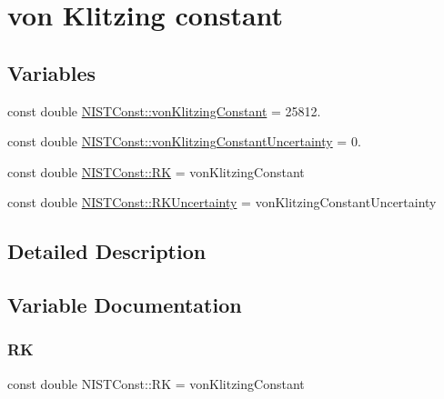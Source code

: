 \hypertarget{group___n_i_s_t_const-von_klitzing_constant}{}\section{von Klitzing constant}
\label{group___n_i_s_t_const-von_klitzing_constant}
\subsection*{Variables}
\begin{DoxyCompactItemize}
\item 
const double \hyperlink{group___n_i_s_t_const-von_klitzing_constant_ga664441cab64a6a8feda702f6354c1e7f}{N\+I\+S\+T\+Const\+::von\+Klitzing\+Constant} = 25812.
\item 
const double \hyperlink{group___n_i_s_t_const-von_klitzing_constant_ga8fa7b05f4ab4958f9bed81f592304e49}{N\+I\+S\+T\+Const\+::von\+Klitzing\+Constant\+Uncertainty} = 0.
\item 
const double \hyperlink{group___n_i_s_t_const-von_klitzing_constant_ga49d5fad3e8e7b5800765ce47a748ebae}{N\+I\+S\+T\+Const\+::\+RK} = von\+Klitzing\+Constant
\item 
const double \hyperlink{group___n_i_s_t_const-von_klitzing_constant_ga2be2be38b579e6afb6f1b0d177d7786b}{N\+I\+S\+T\+Const\+::\+R\+K\+Uncertainty} = von\+Klitzing\+Constant\+Uncertainty
\end{DoxyCompactItemize}


\subsection{Detailed Description}


\subsection{Variable Documentation}
\mbox{\label{group___n_i_s_t_const-von_klitzing_constant_ga49d5fad3e8e7b5800765ce47a748ebae}} 
\subsubsection{\texorpdfstring{RK}{RK}}
{\footnotesize\ttfamily const double N\+I\+S\+T\+Const\+::\+RK = von\+Klitzing\+Constant}

